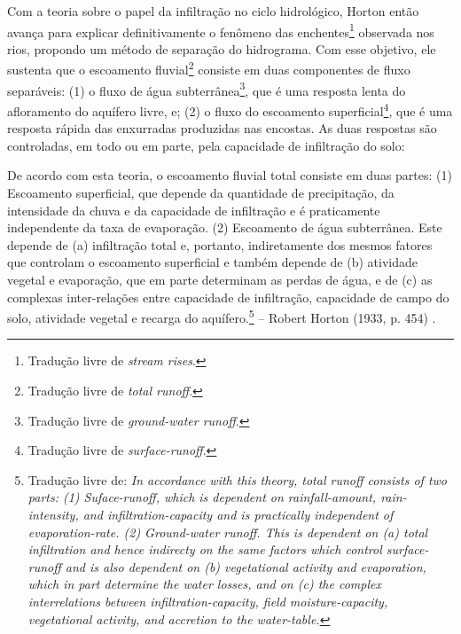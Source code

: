 \documentclass[./main.tex]{subfiles}
\begin{document}
\par Com a teoria sobre o papel da infiltração no ciclo hidrológico, Horton então avança para explicar definitivamente o fenômeno das enchentes\footnote{Tradução livre de \textit{stream rises}.} observada nos rios, propondo um método de separação do hidrograma. Com esse objetivo, ele sustenta que o escoamento fluvial\footnote{Tradução livre de \textit{total runoff}.} consiste em duas componentes de fluxo separáveis: (1) o fluxo de água subterrânea\footnote{Tradução livre de \textit{ground-water runoff}.}, que é uma resposta lenta do afloramento do aquífero livre, e; (2) o fluxo do escoamento superficial\footnote{Tradução livre de \textit{surface-runoff}.}, que é uma resposta rápida das enxurradas produzidas nas encostas. As duas respostas são controladas, em todo ou em parte, pela capacidade de infiltração do solo:

\begin{adjustwidth}{100pt}{0pt}
\medskip
\small De acordo com esta teoria, o escoamento fluvial total consiste em duas partes: (1) Escoamento superficial, que depende da quantidade de precipitação, da intensidade da chuva e da capacidade de infiltração e é praticamente independente da taxa de evaporação. (2) Escoamento de água subterrânea. Este depende de (a) infiltração total e, portanto, indiretamente dos mesmos fatores que controlam o escoamento superficial e também depende de (b) atividade vegetal e evaporação, que em parte determinam as perdas de água, e de (c) as complexas inter-relações entre capacidade de infiltração, capacidade de campo do solo, atividade vegetal e recarga do aquífero.\footnote{Tradução livre de: \textit{In accordance with this theory, total runoff consists of two parts: (1) Suface-runoff, which is dependent on rainfall-amount, rain-intensity, and infiltration-capacity and is practically independent of evaporation-rate. (2) Ground-water runoff. This is dependent on (a) total infiltration and hence indirecty on the same factors which control surface-runoff and is also dependent on (b) vegetational activity and evaporation, which in part determine the water losses, and on (c) the complex interrelations between infiltration-capacity, field moisture-capacity, vegetational activity, and accretion to the water-table.}} -- Robert Horton (1933, p. 454) \cite{Horton1933}.
\medskip
\end{adjustwidth}
\end{document}
